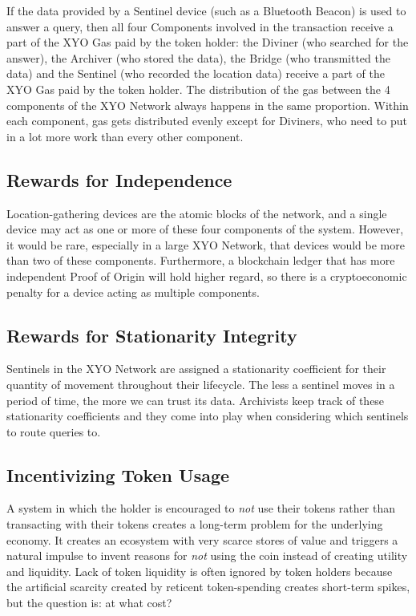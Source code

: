 \documentclass{article}
\begin{document}
If the data provided by a Sentinel device (such as a Bluetooth Beacon) is used to answer a query, then all four Components involved in the transaction receive a part of the XYO Gas paid by the token holder: the Diviner (who searched for the answer), the Archiver (who stored the data), the Bridge (who transmitted the data) and the Sentinel (who recorded the location data) receive a part of the XYO Gas paid by the token holder. The distribution of the gas between the 4 components of the XYO Network always happens in the same proportion. Within each component, gas gets distributed evenly except for Diviners, who need to put in a lot more work than every other component.

\subsection{Rewards for Independence}

Location-gathering devices are the atomic blocks of the network, and a single device may act as one or more of these four components of the system. However, it would be rare, especially in a large XYO Network, that devices would be more than two of these components. Furthermore, a blockchain ledger that has more independent Proof of Origin will hold higher regard, so there is a cryptoeconomic penalty for a device acting as multiple components.

\subsection{Rewards for Stationarity Integrity}

Sentinels in the XYO Network are assigned a stationarity coefficient for their quantity of movement throughout their lifecycle. The less a sentinel moves in a period of time, the more we can trust its data. Archivists keep track of these stationarity coefficients and they come into play when considering which sentinels to route queries to.

\subsection{Incentivizing Token Usage}
A system in which the holder is encouraged to \textit{not} use their tokens rather than transacting with their tokens creates a long-term problem for the underlying economy.  It creates an ecosystem with very scarce stores of value and triggers a natural impulse to invent reasons for \textit{not} using the coin instead of creating utility and liquidity. Lack of token liquidity is often ignored by token holders because the artificial scarcity created by reticent token-spending creates short-term spikes, but the question is: at what cost?
\end{document}
